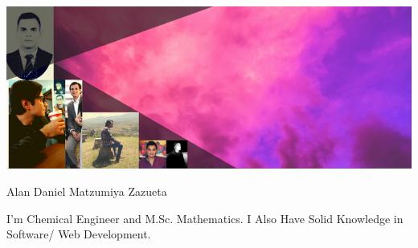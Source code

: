 \vspace{-3pt}
\colorbox{darkcol}{}


\includegraphics[width=0.9995\linewidth]{../../img/banner.png}	%

%
\vspace{-127pt}
\hspace{0.32\linewidth}
\colorbox{darkcol}{
    \parbox{0.60\linewidth}{\vspace{-1.15mm}\hspace{-2.10mm}\colorbox{fgreycol}{\parbox{1.025\linewidth}{\textcolor{lightcol}{\hspace{0.22\linewidth}Alan Daniel Matzumiya Zazueta}}}
        \vspace{-4.5mm}
        \begin{center}
             \textcolor{lightcol}{I'm Chemical Engineer and M.Sc. Mathematics. I Also Have Solid Knowledge in Software/ Web Development.}
        \end{center}
    }
}
\vspace{59.5pt}
%